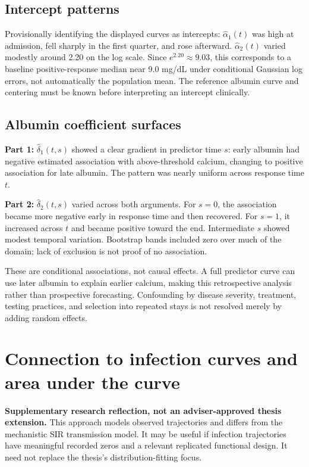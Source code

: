 \documentclass[11pt]{article}
\begin{document}
\subsection{Intercept patterns}
Provisionally identifying the displayed curves as intercepts: $\widehat\alpha_1(t)$ was high at admission, fell sharply in the first quarter, and rose afterward. $\widehat\alpha_2(t)$ varied modestly around 2.20 on the log scale. Since $e^{2.20}\approx9.03$, this corresponds to a baseline positive-response median near 9.0 mg/dL under conditional Gaussian log errors, not automatically the population mean. The reference albumin curve and centering must be known before interpreting an intercept clinically.
\subsection{Albumin coefficient surfaces}
\textbf{Part 1:} $\widehat\delta_1(t,s)$ showed a clear gradient in predictor time $s$: early albumin had negative estimated association with above-threshold calcium, changing to positive association for late albumin. The pattern was nearly uniform across response time $t$.

\textbf{Part 2:} $\widehat\delta_2(t,s)$ varied across both arguments. For $s=0$, the association became more negative early in response time and then recovered. For $s=1$, it increased across $t$ and became positive toward the end. Intermediate $s$ showed modest temporal variation. Bootstrap bands included zero over much of the domain; lack of exclusion is not proof of no association.

These are conditional associations, not causal effects. A full predictor curve can use later albumin to explain earlier calcium, making this retrospective analysis rather than prospective forecasting. Confounding by disease severity, treatment, testing practices, and selection into repeated stays is not resolved merely by adding random effects.
\section{Connection to infection curves and area under the curve}
\textbf{Supplementary research reflection, not an adviser-approved thesis extension.} This approach models observed trajectories and differs from the mechanistic SIR transmission model. It may be useful if infection trajectories have meaningful recorded zeros and a relevant replicated functional design. It need not replace the thesis's distribution-fitting focus.
\end{document}
